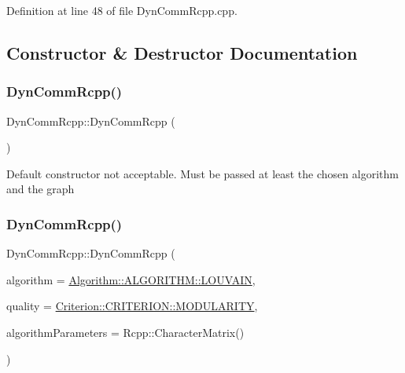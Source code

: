 Definition at line 48 of file Dyn\+Comm\+Rcpp.\+cpp.



\subsection{Constructor \& Destructor Documentation}
\mbox{\label{classDynCommRcpp_a65289b1838009023b527237b64c073a2}} 
\subsubsection{\texorpdfstring{Dyn\+Comm\+Rcpp()}{DynCommRcpp()}\hspace{0.1cm}{\footnotesize\ttfamily [1/2]}}
{\footnotesize\ttfamily Dyn\+Comm\+Rcpp\+::\+Dyn\+Comm\+Rcpp (\begin{DoxyParamCaption}{ }\end{DoxyParamCaption})\hspace{0.3cm}{\ttfamily [delete]}}

Default constructor not acceptable. Must be passed at least the chosen algorithm and the graph \mbox{\label{classDynCommRcpp_a1e3ae3a0be89f2a661dc09d7842a3ac7}} 
\subsubsection{\texorpdfstring{Dyn\+Comm\+Rcpp()}{DynCommRcpp()}\hspace{0.1cm}{\footnotesize\ttfamily [2/2]}}
{\footnotesize\ttfamily Dyn\+Comm\+Rcpp\+::\+Dyn\+Comm\+Rcpp (\begin{DoxyParamCaption}\item[{\hyperlink{classAlgorithm_a38e19a8c3dc51b97563a34d9e59a748d}{Algorithm\+::\+A\+L\+G\+O\+R\+I\+T\+HM}}]{algorithm = {\ttfamily \hyperlink{classAlgorithm_a38e19a8c3dc51b97563a34d9e59a748dab77e66715d6be972cdbf6cc4d990e732}{Algorithm\+::\+A\+L\+G\+O\+R\+I\+T\+H\+M\+::\+L\+O\+U\+V\+A\+IN}},  }\item[{const \hyperlink{classCriterion_a55594c223ce0837b8319c46c66cb648f}{Criterion\+::\+C\+R\+I\+T\+E\+R\+I\+ON} \&}]{quality = {\ttfamily \hyperlink{classCriterion_a55594c223ce0837b8319c46c66cb648fa2a7d416fbe43baf234420601ea73d946}{Criterion\+::\+C\+R\+I\+T\+E\+R\+I\+O\+N\+::\+M\+O\+D\+U\+L\+A\+R\+I\+TY}},  }\item[{Rcpp\+::\+Character\+Matrix}]{algorithm\+Parameters = {\ttfamily Rcpp\+:\+:CharacterMatrix()} }\end{DoxyParamCaption})\hspace{0.3cm}{\ttfamily [inline]}}

